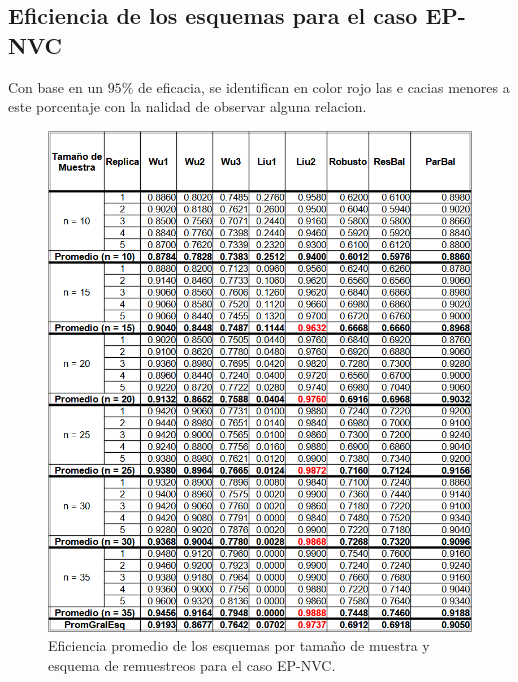 \subsection{Eficiencia de los esquemas para el caso EP-NVC}
Con base en un $95\%$ de eficacia, se identifican en color rojo las e cacias
menores a este porcentaje con la nalidad de observar alguna relacion.
\begin{figure}[H] 
	\centering 
	\includegraphics[width=0.70\linewidth]{img/EP_NVC_Efic_Esq.png} 
	\caption{Eficiencia promedio de los esquemas por tamaño de muestra y esquema de remuestreos para el caso EP-NVC.} 
	\label{fig:EP_NVC_Esq}
\end{figure}

\FloatBarrier
